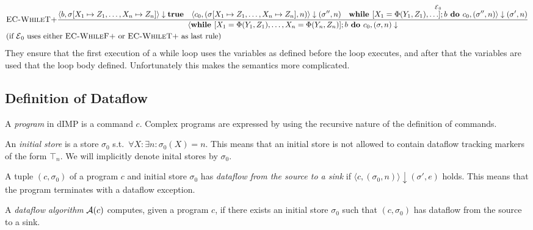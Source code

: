 \begin{landscape}
\begin{align*}
        &\textsc{EC-WhileT+}\ddfrac
        {\langle b, \sigma[X_1 \mapsto Z_1, \ldots, X_n \mapsto Z_n] \rangle \downarrow \textbf{true}
        \quad \langle c_0, (\sigma[X_1 \mapsto Z_1, \ldots, X_n \mapsto Z_n], n) \rangle \downarrow (\sigma'', n)
        \quad \overset{\E_0}{\textbf{while }[X_1= \Phi(Y_1, Z_1), \ldots];%
        b \textbf{ do } c_0, (\sigma'', n) \rangle \downarrow (\sigma', n) }}
        {\langle \textbf{while }[X_1= \Phi(Y_1, Z_1), \ldots, X_n = \Phi(Y_n, Z_n)];
        b \textbf{ do } c_0, (\sigma, n) 
        \downarrow }\\
        &\text{(if $\E_0$ uses either \textsc{EC-WhileF+} or \textsc{EC-WhileT+} as last rule)}\\
    \end{align*}
    They ensure that the first execution of a while loop uses the variables as defined before
    the loop executes, and after that the variables are used that the loop body 
    defined.
    Unfortunately this makes the semantics more complicated.
\end{landscape}

\subsection{Definition of Dataflow}
\begin{definition}[Program]
    A \emph{program} in dIMP is a command $c$.
    Complex programs are expressed by using the recursive nature of
    the definition of commands.
\end{definition}

\begin{definition}
    An \emph{initial store} is a store $\sigma_0$ s.t.\ 
    $\forall X: \exists n: \sigma_0(X) = n$.
    This means that an initial store is not allowed to contain dataflow tracking 
    markers of the form $\top_n$.
    We will implicitly denote inital stores by $\sigma_0$.
\end{definition}

\begin{definition}[Dataflow]
    A tuple $(c, \sigma_0)$ of a program $c$ and initial store $\sigma_0$ 
    has \emph{dataflow from the source to a sink} if
    $\langle c, (\sigma_0, n) \rangle \downarrow (\sigma', e)$ holds.
    This means that the program terminates with a dataflow exception.
\end{definition}

\begin{definition}
    A \emph{dataflow algorithm} $\operatorname{\mathcal{A}}(c)$ computes, given a program $c$,
    if there exists an initial store $\sigma_0$ 
    such that $(c, \sigma_0)$ has dataflow from the source to a sink.
\end{definition}

